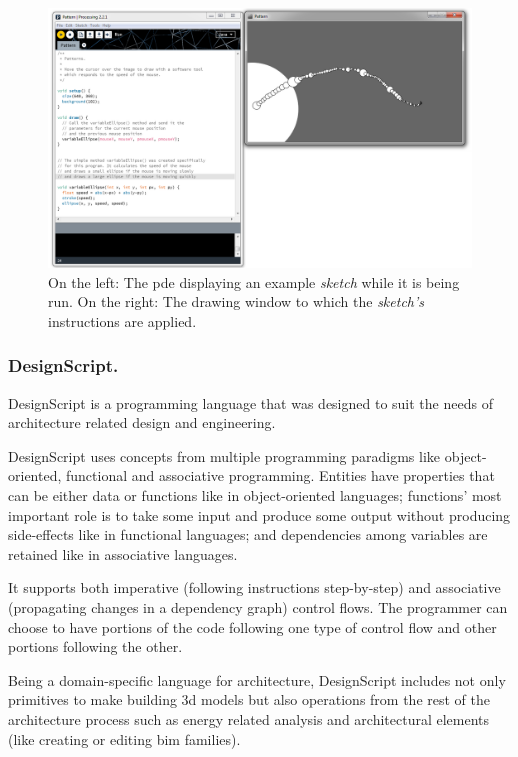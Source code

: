 \documentclass{./llncs2e/llncs}
\begin{document}
	\begin{figure}
		\centering
		\includegraphics[width=1.0\textwidth]{img/proc_dev_env}
		\caption{On the left: The \ac{pde} displaying an example \emph{sketch} while it is being run. On the right: The drawing window to which the \emph{sketch's} instructions are applied.}
		\label{fig:proc:dev:env}
	\end{figure} 
	

\subsubsection{DesignScript.}
	DesignScript\cite{aish2012designscript} is a programming language that was designed to suit the needs of architecture related design and engineering.
	
	DesignScript uses concepts from multiple programming paradigms like object-oriented, functional and associative programming. 
	Entities have properties that can be either data or functions like in object-oriented languages; functions' most important role is to take some input and produce some output without producing side-effects like in functional languages; and dependencies among variables are retained like in associative languages.
	
	It supports both imperative (following instructions step-by-step) and associative (propagating changes in a dependency graph) control flows. 
	The programmer can choose to have portions of the code following one type of control flow and other portions following the other.
	
	Being a domain-specific language for architecture, DesignScript includes not only primitives to make building 3d models but also operations from the rest of the architecture process such as energy related analysis and architectural elements (like creating or editing \ac{bim} families).
	
\end{document}
